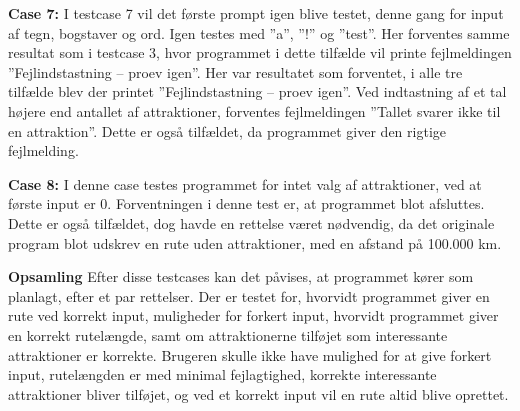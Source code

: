 \textbf{Case 7:}\newline
I testcase 7 vil det første prompt igen blive testet, denne gang for input af tegn, bogstaver og ord. Igen testes med ”a”, ”!” og ”test”. Her forventes samme resultat som i testcase 3, hvor programmet i dette tilfælde vil printe fejlmeldingen ”Fejlindstastning – proev igen”. Her var resultatet som forventet, i alle tre tilfælde blev der printet ”Fejlindstastning – proev igen”. Ved  indtastning af et tal højere end antallet af attraktioner, forventes fejlmeldingen ”Tallet svarer ikke til en attraktion”. Dette er også tilfældet, da programmet giver den rigtige fejlmelding.

\textbf{Case 8:}\newline
I denne case testes programmet for intet valg af attraktioner, ved at første input er 0. Forventningen i denne test er, at programmet blot afsluttes. Dette er også tilfældet, dog havde en rettelse været nødvendig, da det originale program blot udskrev en rute uden attraktioner, med en afstand på 100.000 km.


\textbf{Opsamling}\newline
Efter disse testcases kan det påvises, at programmet kører som planlagt, efter et par rettelser. Der er testet for, hvorvidt programmet giver en rute ved korrekt input, muligheder for forkert input, hvorvidt programmet giver en korrekt rutelængde, samt om attraktionerne tilføjet som interessante attraktioner er korrekte. Brugeren skulle ikke have mulighed for at give forkert input, rutelængden er med minimal fejlagtighed, korrekte interessante attraktioner bliver tilføjet, og ved et korrekt input vil en rute altid blive oprettet.
